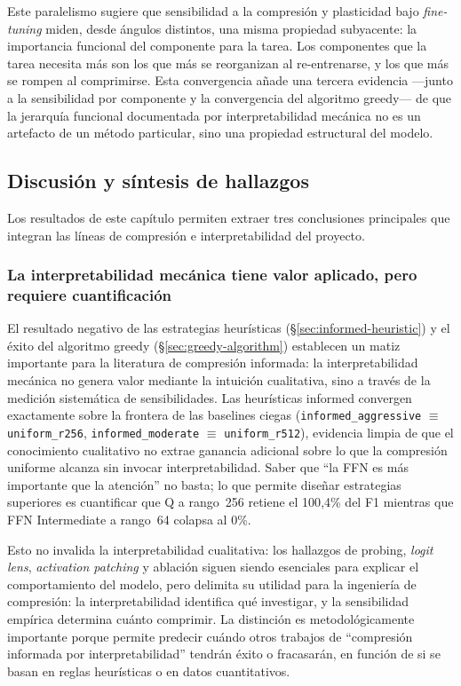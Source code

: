 Este paralelismo sugiere que sensibilidad a la compresión y plasticidad
bajo \emph{fine-tuning} miden, desde ángulos distintos, una misma propiedad
subyacente: la importancia funcional del componente para la tarea. Los
componentes que la tarea necesita más son los que más se reorganizan al
re-entrenarse, y los que más se rompen al comprimirse. Esta convergencia
añade una tercera evidencia ---junto a la sensibilidad por componente y
la convergencia del algoritmo greedy--- de que la jerarquía funcional
documentada por interpretabilidad mecánica no es un artefacto de un
método particular, sino una propiedad estructural del modelo.


\subsection{Discusión y síntesis de hallazgos}
\label{sec:sintesis-discusion}

Los resultados de este capítulo permiten extraer tres conclusiones
principales que integran las líneas de compresión e interpretabilidad del
proyecto.

\subsubsection{La interpretabilidad mecánica tiene valor aplicado, pero
requiere cuantificación}

El resultado negativo de las estrategias heurísticas
(\S\ref{sec:informed-heuristic}) y el éxito del algoritmo greedy
(\S\ref{sec:greedy-algorithm}) establecen un matiz importante para la
literatura de compresión informada: la interpretabilidad mecánica no
genera valor mediante la intuición cualitativa, sino a través de la
medición sistemática de sensibilidades. Las heurísticas informed
convergen exactamente sobre la frontera de las baselines ciegas
(\texttt{informed\_aggressive} $\equiv$ \texttt{uniform\_r256},
\texttt{informed\_moderate} $\equiv$ \texttt{uniform\_r512}), evidencia
limpia de que el conocimiento cualitativo no extrae ganancia adicional
sobre lo que la compresión uniforme alcanza sin invocar interpretabilidad.
Saber que ``la FFN es más importante que la atención'' no basta; lo que
permite diseñar estrategias superiores es cuantificar que Q a rango~256
retiene el 100{,}4\% del F1 mientras que FFN Intermediate a rango~64
colapsa al 0\%.

Esto no invalida la interpretabilidad cualitativa: los hallazgos de
probing, \emph{logit lens}, \emph{activation patching} y ablación siguen siendo
esenciales para explicar el comportamiento del modelo, pero
delimita su utilidad para la ingeniería de compresión: la interpretabilidad
identifica qué investigar, y la sensibilidad empírica determina
cuánto comprimir. La distinción es metodológicamente importante
porque permite predecir cuándo otros trabajos de ``compresión informada
por interpretabilidad'' tendrán éxito o fracasarán, en función de si se
basan en reglas heurísticas o en datos cuantitativos.

